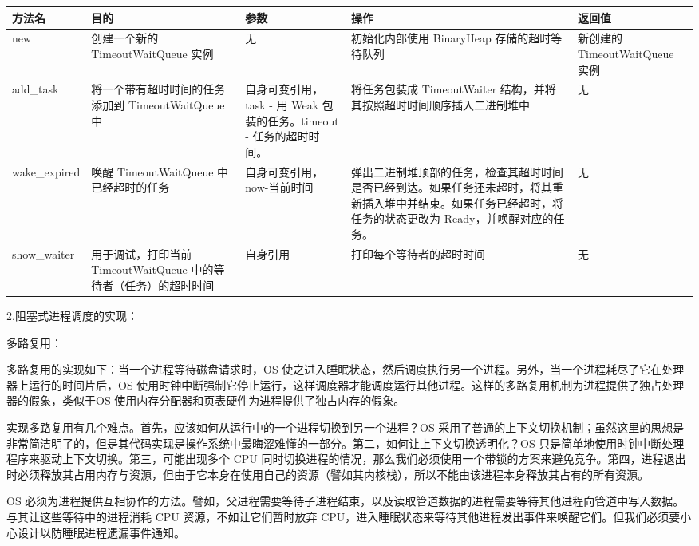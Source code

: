 \begin{table}[H]
    \begin{tabularx}{17cm}{|X|X|X|X|X|}
        \hline
        方法名 & 目的 & 参数 & 操作 & 返回值 \\
        \hline
        new & 创建一个新的 TimeoutWaitQueue 实例 & 无 & 初始化内部使用 BinaryHeap 存储的超时等待队列 & 新创建的 TimeoutWaitQueue 实例 \\
        \hline
        add_task & 将一个带有超时时间的任务添加到 TimeoutWaitQueue 中 & 自身可变引用，task - 用 Weak 包装的任务。timeout - 任务的超时时间。 &  将任务包装成 TimeoutWaiter 结构，并将其按照超时时间顺序插入二进制堆中 & 无 \\
        \hline
        wake_expired & 唤醒 TimeoutWaitQueue 中已经超时的任务 & 自身可变引用，now-当前时间 & 弹出二进制堆顶部的任务，检查其超时时间是否已经到达。如果任务还未超时，将其重新插入堆中并结束。如果任务已经超时，将任务的状态更改为 Ready，并唤醒对应的任务。 & 无 \\
        \hline
        show_waiter & 用于调试，打印当前 TimeoutWaitQueue 中的等待者（任务）的超时时间 & 自身引用 & 打印每个等待者的超时时间 & 无 \\
        \hline
    \end{tabularx}
\end{table}

2.阻塞式进程调度的实现：

多路复用：

多路复用的实现如下：当一个进程等待磁盘请求时，OS 使之进入睡眠状态，然后调度执行另一个进程。另外，当一个进程耗尽了它在处理器上运行的时间片后，OS 使用时钟中断强制它停止运行，这样调度器才能调度运行其他进程。这样的多路复用机制为进程提供了独占处理器的假象，类似于OS 使用内存分配器和页表硬件为进程提供了独占内存的假象。

实现多路复用有几个难点。首先，应该如何从运行中的一个进程切换到另一个进程？OS 采用了普通的上下文切换机制；虽然这里的思想是非常简洁明了的，但是其代码实现是操作系统中最晦涩难懂的一部分。第二，如何让上下文切换透明化？OS 只是简单地使用时钟中断处理程序来驱动上下文切换。第三，可能出现多个 CPU 同时切换进程的情况，那么我们必须使用一个带锁的方案来避免竞争。第四，进程退出时必须释放其占用内存与资源，但由于它本身在使用自己的资源（譬如其内核栈），所以不能由该进程本身释放其占有的所有资源。

OS 必须为进程提供互相协作的方法。譬如，父进程需要等待子进程结束，以及读取管道数据的进程需要等待其他进程向管道中写入数据。与其让这些等待中的进程消耗 CPU 资源，不如让它们暂时放弃 CPU，进入睡眠状态来等待其他进程发出事件来唤醒它们。但我们必须要小心设计以防睡眠进程遗漏事件通知。

